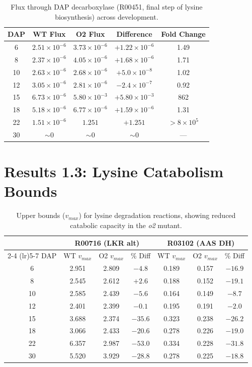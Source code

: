 \documentclass[11pt,letterpaper]{article}
\begin{document}
\begin{table}[H]
\centering
\caption{Flux through DAP decarboxylase (R00451, final step of lysine biosynthesis) across development.}
\label{stab:lysine_bio}
\begin{tabular}{ccccc}
\toprule
DAP & WT Flux & O2 Flux & Difference & Fold Change \\
\midrule
6  & $2.51 \times 10^{-6}$ & $3.73 \times 10^{-6}$ & $+1.22 \times 10^{-6}$ & 1.49 \\
8  & $2.37 \times 10^{-6}$ & $4.05 \times 10^{-6}$ & $+1.68 \times 10^{-6}$ & 1.71 \\
10 & $2.63 \times 10^{-6}$ & $2.68 \times 10^{-6}$ & $+5.0 \times 10^{-8}$  & 1.02 \\
12 & $3.05 \times 10^{-6}$ & $2.81 \times 10^{-6}$ & $-2.4 \times 10^{-7}$  & 0.92 \\
15 & $6.73 \times 10^{-6}$ & $5.80 \times 10^{-3}$ & $+5.80 \times 10^{-3}$ & 862 \\
18 & $5.18 \times 10^{-6}$ & $6.77 \times 10^{-6}$ & $+1.59 \times 10^{-6}$ & 1.31 \\
22 & $1.51 \times 10^{-6}$ & $1.251$               & $+1.251$               & $>8 \times 10^{5}$ \\
30 & $\sim 0$              & $\sim 0$              & $\sim 0$               & --- \\
\bottomrule
\end{tabular}
\end{table}

\clearpage


\section{Results 1.3: Lysine Catabolism Bounds}

\begin{table}[H]
\centering
\caption{Upper bounds ($v_{max}$) for lysine degradation reactions, showing reduced catabolic capacity in the \textit{o2} mutant.}
\label{stab:bounds}
\begin{tabular}{ccccccc}
\toprule
 & \multicolumn{3}{c}{R00716 (LKR alt)} & \multicolumn{3}{c}{R03102 (AAS DH)} \\
\cmidrule(lr){2-4} \cmidrule(lr){5-7}
DAP & WT $v_{max}$ & O2 $v_{max}$ & \% Diff & WT $v_{max}$ & O2 $v_{max}$ & \% Diff \\
\midrule
6  & 2.951 & 2.809 & $-4.8$  & 0.189 & 0.157 & $-16.9$ \\
8  & 2.545 & 2.612 & $+2.6$  & 0.188 & 0.152 & $-19.1$ \\
10 & 2.585 & 2.439 & $-5.6$  & 0.164 & 0.149 & $-8.7$  \\
12 & 2.401 & 2.399 & $-0.1$  & 0.195 & 0.191 & $-2.0$  \\
15 & 3.688 & 2.374 & $-35.6$ & 0.323 & 0.238 & $-26.2$ \\
18 & 3.066 & 2.433 & $-20.6$ & 0.278 & 0.226 & $-19.0$ \\
22 & 6.357 & 2.987 & $-53.0$ & 0.334 & 0.228 & $-31.8$ \\
30 & 5.520 & 3.929 & $-28.8$ & 0.278 & 0.225 & $-18.8$ \\
\bottomrule
\end{tabular}
\end{table}
\end{document}
